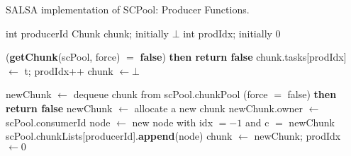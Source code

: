 \begin{algo}[!ht]
\caption{SALSA implementation of SCPool: Producer Functions.}
\label{alg:producer-non-fifo}
\scriptsize
\begin{minipage}[t]{0.48\textwidth}
\begin{distribalgo}[1]
\setcounter{ALC@line}{\value{alg:non-fifo:lines}}

	\STATE int producerId
	\STATE Chunk chunk; initially $\bot$  \label{alg:line:chunk}
	\STATE int prodIdx; initially $0$ 
\ENDINDENT

\medskip

		 ({\bf getChunk}(scPool, force) $=$ {\bf false}) {\bf then return false}
	\ENDINDENT
	\STATE chunk.tasks[prodIdx] $\leftarrow$ t; prodIdx++ \label{alg:line:chunk-insert}
	  \STATE chunk $\leftarrow \bot$ 
	\ENDINDENT
\ENDINDENT

\setcounter{alg:non-fifo:lines}{\value{ALC@line}} %
\end{distribalgo}
\end{minipage}%
%
\hfill
%
\begin{minipage}[t]{0.48\textwidth}
%
\begin{distribalgo}[1]
\setcounter{ALC@line}{\value{alg:non-fifo:lines}}

	\STATE newChunk $\leftarrow$ dequeue chunk from scPool.chunkPool
	 \label{alg:line:no-chunk-start}
		  (force $=$ false) {\bf then return false} 
		 \STATE newChunk $\leftarrow$ allocate a new chunk \label{alg:line:no-chunk-end}
	\ENDINDENT
	\STATE newChunk.owner $\leftarrow$ scPool.consumerId
	\STATE node $\leftarrow$ new node with idx $=-1$ and c $=$ newChunk
	\STATE scPool.chunkLists[producerId].{\bf append}(node)
	\STATE chunk $\leftarrow$ newChunk; prodIdx $\leftarrow 0$ 
\ENDINDENT

\setcounter{alg:non-fifo:lines}{\value{ALC@line}}
\end{distribalgo}
\end{minipage}
\end{algo}
